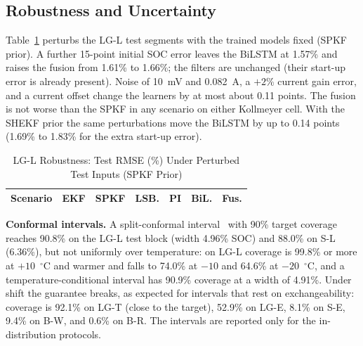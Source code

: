 \documentclass[journal]{IEEEtran}
\begin{document}
\subsection{Robustness and Uncertainty}
Table~\ref{tab:robust} perturbs the LG-L test segments with the trained models fixed (SPKF prior). A further 15-point initial SOC error leaves the BiLSTM at 1.57\% and raises the fusion from 1.61\% to 1.66\%; the filters are unchanged (their start-up error is already present). Noise of 10~mV and 0.082~A, a $+2$\% current gain error, and a current offset change the learners by at most about 0.11 points. The fusion is not worse than the SPKF in any scenario on either Kollmeyer cell. With the SHEKF prior the same perturbations move the BiLSTM by up to 0.14 points (1.69\% to 1.83\% for the extra start-up error).

\begin{table}[!t]
\caption{LG-L Robustness: Test RMSE (\%) Under Perturbed Test Inputs (SPKF Prior)}
\label{tab:robust}
\centering\scriptsize
\setlength{\tabcolsep}{2.2pt}
\begin{tabular}{@{}p{2.55cm}cccccc@{}}
\toprule
Scenario & EKF & SPKF & LSB. & PI & BiL. & Fus.\\
\midrule

\end{tabular}
\end{table}

\textbf{Conformal intervals.} A split-conformal interval~\cite{lei2018conformal,vovk2005algorithmic} with 90\% target coverage reaches 90.8\% on the LG-L test block (width 4.96\% SOC) and 88.0\% on S-L (6.36\%), but not uniformly over temperature: on LG-L coverage is 99.8\% or more at $+10$~$^\circ$C and warmer and falls to 74.0\% at $-10$ and 64.6\% at $-20$~$^\circ$C, and a temperature-conditional interval has 90.9\% coverage at a width of 4.91\%. Under shift the guarantee breaks, as expected for intervals that rest on exchangeability: coverage is 92.1\% on LG-T (close to the target), 52.9\% on LG-E, 8.1\% on S-E, 9.4\% on B-W, and 0.6\% on B-R. The intervals are reported only for the in-distribution protocols.
\end{document}
